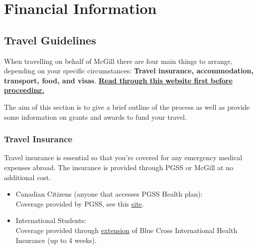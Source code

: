 
\chapter{Financial Information} 


    \section{Travel Guidelines} 
    When travelling on behalf of McGill there are four main things to arrange, depending on your specific circumstances: \textbf{Travel insurance, accommodation, transport, food, and visas}.    \href{https://www.mcgill.ca/financialservices/policies/reimburse/procedures}{\textbf{Read through this website first before proceeding.}}

     The aim of this section is to give a brief outline of the process as well as provide some information on grants and awards to fund your travel.


  \subsection{Travel Insurance} 
    Travel insurance is essential so that you're covered for any emergency medical expenses abroad. The insurance is provided through PGSS or McGill at no additional cost.
    
    \begin{itemize}
    \item Canadian Citizens (anyone that accesses PGSS Health plan):\\
    Coverage provided by PGSS, see this \href{https://studentcare.ca/rte/en/McGilluniversitygraduatestudentspgss\_Travel\_TravelCoverage}{site}.\vspace{5pt}

    \item International Students:\\
    Coverage provided through \href{https://www.mcgill.ca/internationalstudents/health/benefits/going-abroad}{extension} of Blue Cross International Health Insurance (up to 4 weeks).
    \end{itemize}

